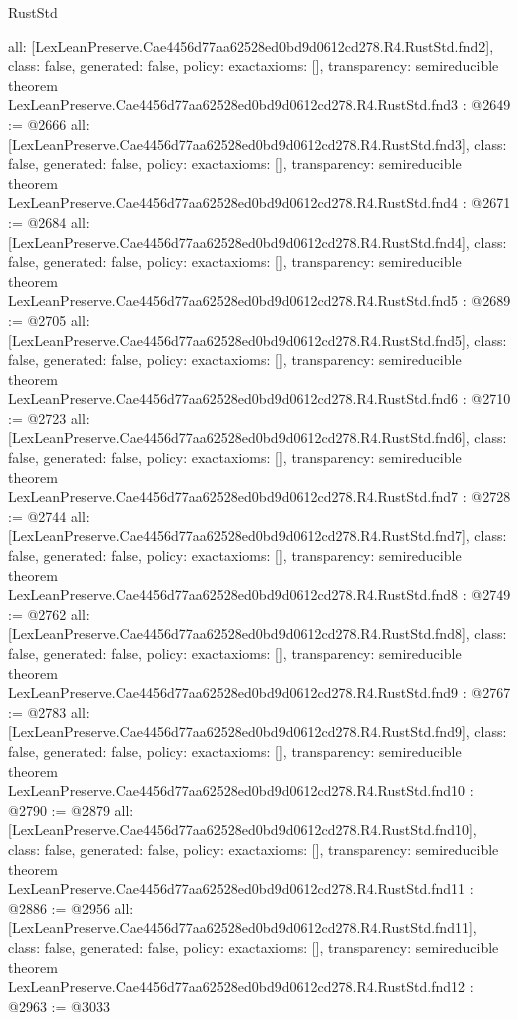 \begin{lexlean}{RustStd}
\begin{coremodule}
{  all: [LexLeanPreserve.Cae4456d77aa62528ed0bd9d0612cd278.R4.RustStd.fnd2],
  class: false,
  generated: false,
  policy: exact{axioms: []},
  transparency: semireducible
}
theorem LexLeanPreserve.Cae4456d77aa62528ed0bd9d0612cd278.R4.RustStd.fnd3 : @2649 := @2666 {
  all: [LexLeanPreserve.Cae4456d77aa62528ed0bd9d0612cd278.R4.RustStd.fnd3],
  class: false,
  generated: false,
  policy: exact{axioms: []},
  transparency: semireducible
}
theorem LexLeanPreserve.Cae4456d77aa62528ed0bd9d0612cd278.R4.RustStd.fnd4 : @2671 := @2684 {
  all: [LexLeanPreserve.Cae4456d77aa62528ed0bd9d0612cd278.R4.RustStd.fnd4],
  class: false,
  generated: false,
  policy: exact{axioms: []},
  transparency: semireducible
}
theorem LexLeanPreserve.Cae4456d77aa62528ed0bd9d0612cd278.R4.RustStd.fnd5 : @2689 := @2705 {
  all: [LexLeanPreserve.Cae4456d77aa62528ed0bd9d0612cd278.R4.RustStd.fnd5],
  class: false,
  generated: false,
  policy: exact{axioms: []},
  transparency: semireducible
}
theorem LexLeanPreserve.Cae4456d77aa62528ed0bd9d0612cd278.R4.RustStd.fnd6 : @2710 := @2723 {
  all: [LexLeanPreserve.Cae4456d77aa62528ed0bd9d0612cd278.R4.RustStd.fnd6],
  class: false,
  generated: false,
  policy: exact{axioms: []},
  transparency: semireducible
}
theorem LexLeanPreserve.Cae4456d77aa62528ed0bd9d0612cd278.R4.RustStd.fnd7 : @2728 := @2744 {
  all: [LexLeanPreserve.Cae4456d77aa62528ed0bd9d0612cd278.R4.RustStd.fnd7],
  class: false,
  generated: false,
  policy: exact{axioms: []},
  transparency: semireducible
}
theorem LexLeanPreserve.Cae4456d77aa62528ed0bd9d0612cd278.R4.RustStd.fnd8 : @2749 := @2762 {
  all: [LexLeanPreserve.Cae4456d77aa62528ed0bd9d0612cd278.R4.RustStd.fnd8],
  class: false,
  generated: false,
  policy: exact{axioms: []},
  transparency: semireducible
}
theorem LexLeanPreserve.Cae4456d77aa62528ed0bd9d0612cd278.R4.RustStd.fnd9 : @2767 := @2783 {
  all: [LexLeanPreserve.Cae4456d77aa62528ed0bd9d0612cd278.R4.RustStd.fnd9],
  class: false,
  generated: false,
  policy: exact{axioms: []},
  transparency: semireducible
}
theorem LexLeanPreserve.Cae4456d77aa62528ed0bd9d0612cd278.R4.RustStd.fnd10 : @2790 := @2879 {
  all: [LexLeanPreserve.Cae4456d77aa62528ed0bd9d0612cd278.R4.RustStd.fnd10],
  class: false,
  generated: false,
  policy: exact{axioms: []},
  transparency: semireducible
}
theorem LexLeanPreserve.Cae4456d77aa62528ed0bd9d0612cd278.R4.RustStd.fnd11 : @2886 := @2956 {
  all: [LexLeanPreserve.Cae4456d77aa62528ed0bd9d0612cd278.R4.RustStd.fnd11],
  class: false,
  generated: false,
  policy: exact{axioms: []},
  transparency: semireducible
}
theorem LexLeanPreserve.Cae4456d77aa62528ed0bd9d0612cd278.R4.RustStd.fnd12 : @2963 := @3033 {
}
\end{coremodule}
\end{lexlean}

